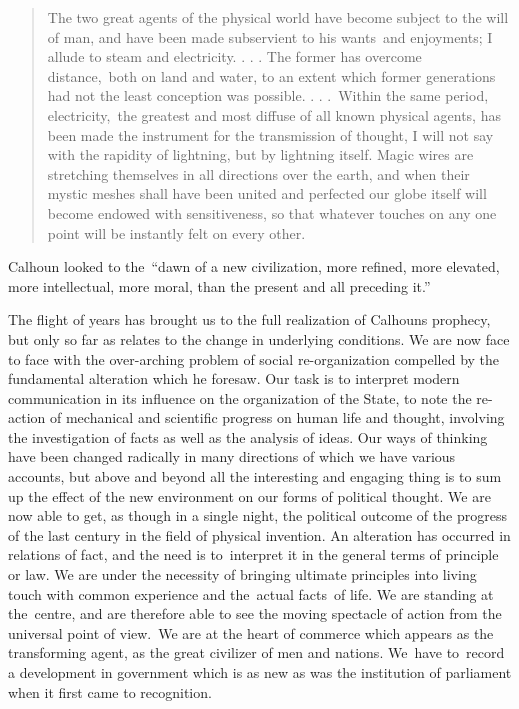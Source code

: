 \documentclass[twoside,symmetric,nobib,justified]{tufte-book}
\begin{document}
\begin{quote}
The two great agents of the physical world have become subject to the
will of man, and have been made subservient to his wants~and enjoyments;
I allude to steam and electricity. . . . The former has overcome
distance,~both on land and water, to an extent which former generations
had not the least conception was possible. . . .~Within the same period,
electricity,~the greatest and most diffuse of all known physical agents,
has been made the instrument for the transmission of thought, I will not
say with the rapidity of lightning, but by lightning itself. Magic wires
are stretching themselves in all directions over the earth, and when
their mystic meshes shall have been united and perfected our globe
itself will become endowed with sensitiveness, so that whatever touches
on any one point will be instantly felt on every other.~
\end{quote}

\noindent Calhoun looked to the~``dawn of a new civilization, more refined, more
elevated, more intellectual, more moral, than the present and all
preceding it.''

The flight of years has brought us to the full realization of
Calhoun\textquotesingle s prophecy, but only so far as relates to the
change in underlying conditions. We are now face to face with the
over-arching problem of social re-organization compelled by the
fundamental alteration which he foresaw. Our task is to interpret modern
communication in its influence on the organization of the State, to note
the re-action of mechanical and scientific progress on human life and
thought, involving the investigation of facts as well as the analysis of
ideas. Our ways of thinking have been changed radically in many
directions of which we have various accounts, but above and beyond all
the interesting and engaging thing is to sum up the effect of the new
environment on our forms of political thought. We are now able to get,
as though in a single night, the political outcome of the progress of
the last century in the field of physical invention. An alteration has
occurred in relations of fact, and the need is to~interpret it in the
general terms of principle or law. We are under the necessity of
bringing ultimate principles into living touch with common experience
and the~actual facts~of life. We are standing at the~centre, and are
therefore able to see the moving spectacle of action from the universal
point of view.~We are at the heart of commerce which appears as the
transforming agent, as the great civilizer of men and nations. We~have
to~record a development in government which is as new as was the
institution of parliament when it first came to recognition.~
\end{document}

